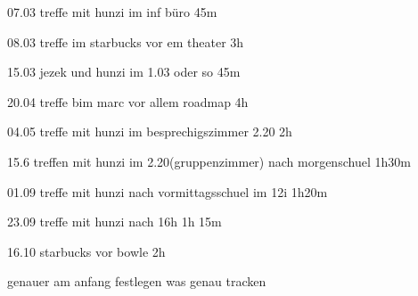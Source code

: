 07.03 treffe mit hunzi im inf büro 45m

08.03 treffe im starbucks vor em theater 3h

15.03 jezek und hunzi im 1.03 oder so 45m

20.04 treffe bim marc vor allem roadmap 4h

04.05 treffe mit hunzi im besprechigszimmer 2.20 2h

15.6 treffen mit hunzi im 2.20(gruppenzimmer) nach morgenschuel 1h30m

01.09 treffe mit hunzi nach vormittagsschuel im 12i 1h20m

23.09 treffe mit hunzi nach 16h 1h 15m

16.10 starbucks vor bowle 2h



genauer am anfang festlegen was genau tracken
